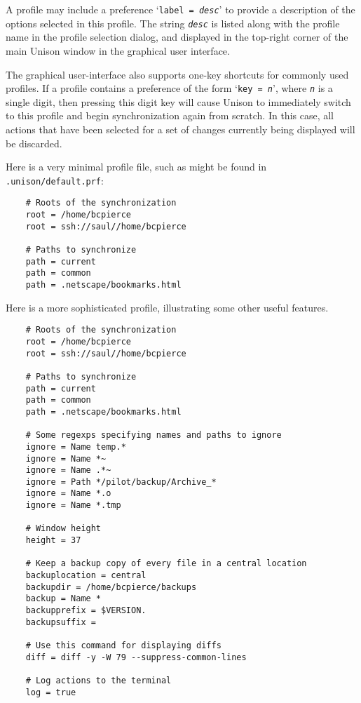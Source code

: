 \documentclass{article}
\newcommand{\ARG}[1]{\texttt{\textit{#1}}}
\begin{document}
A profile may include a preference `\texttt{label = \ARG{desc}}' to
provide a description of the options selected in this profile.  The
string \ARG{desc} is listed along with the profile name in the profile
selection dialog, and displayed in the top-right corner of the main
Unison window in the graphical user interface.

The graphical user-interface also supports one-key shortcuts for commonly
used profiles.  If a profile contains a preference of the form 
%
`\texttt{key = \ARG{n}}', where \ARG{n} is a single digit, then
pressing this digit key will cause Unison to immediately switch to
this profile and begin synchronization again from scratch.  In this
case, all actions that have been selected for a set of changes
currently being displayed will be discarded.




Here is a very minimal profile file, such as might be found in {\tt
  .unison/default.prf}:
\begin{verbatim}
    # Roots of the synchronization
    root = /home/bcpierce
    root = ssh://saul//home/bcpierce

    # Paths to synchronize 
    path = current
    path = common
    path = .netscape/bookmarks.html
\end{verbatim}


Here is a more sophisticated profile, illustrating some other useful
features. 
\begin{verbatim}
    # Roots of the synchronization
    root = /home/bcpierce
    root = ssh://saul//home/bcpierce

    # Paths to synchronize 
    path = current
    path = common
    path = .netscape/bookmarks.html

    # Some regexps specifying names and paths to ignore
    ignore = Name temp.*
    ignore = Name *~
    ignore = Name .*~
    ignore = Path */pilot/backup/Archive_*
    ignore = Name *.o
    ignore = Name *.tmp

    # Window height
    height = 37

    # Keep a backup copy of every file in a central location
    backuplocation = central
    backupdir = /home/bcpierce/backups
    backup = Name *
    backupprefix = $VERSION.
    backupsuffix = 

    # Use this command for displaying diffs
    diff = diff -y -W 79 --suppress-common-lines

    # Log actions to the terminal
    log = true
\end{verbatim}
\end{document}
